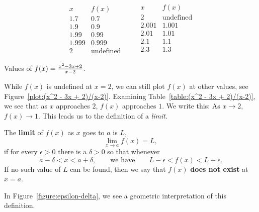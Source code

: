 \begin{margintable}[-1in]
\[
\begin{array}{c|c}
 x & f(x) \\ \hline
 1.7 &  0.7 \\
 1.9 &  0.9 \\
 1.99 &  0.99 \\
 1.999 &  0.999 \\
  2 &  \text{undefined}
\end{array}\qquad
\begin{array}{c|c}
 x & f(x) \\ \hline
  2 & \text{undefined}\\
 2.001&  1.001\\
 2.01&  1.01\\
 2.1 &  1.1 \\
 2.3 &  1.3 \\
\end{array}
\]
\caption{Values of $f(x)=\protect\frac{x^2 - 3x + 2}{x-2}$.}
\label{table:(x^2 - 3x + 2)/(x-2)}
\end{margintable}
While $f(x)$ is undefined at $x=2$, we can still plot $f(x)$ at other
values, see Figure~\ref{plot:(x^2 - 3x + 2)/(x-2)}. Examining
Table~\ref{table:(x^2 - 3x + 2)/(x-2)}, we see that as $x$ approaches
$2$, $f(x)$ approaches $1$. We write this: As $x \to 2$, $f(x) \to 1$.
This leads us to the definition of a \textit{limit}.

\break

\begin{definition}\label{def:limit} 
The \textbf{limit} of $f(x)$ as $x$ goes to $a$ is $L$,
\[
\lim_{x\to a}f(x)=L,
\] 
if for every $\epsilon>0$ there is a $\delta > 0$ so that
whenever
\[
a- \delta < x < a+ \delta, \qquad\text{we have} \qquad L-\epsilon<
f(x)<L+\epsilon.
\] 
If no such value of $L$ can be
found, then we say that $f(x)$ \textbf{does not exist} at $x=a$.
\end{definition}

In Figure~\ref{figure:epsilon-delta}, we see a geometric
interpretation of this definition.

